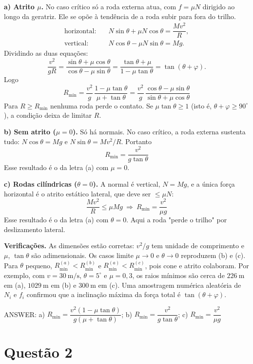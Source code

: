 \documentclass{article}%
\begin{document}
\textbf{a) Atrito $\mu$.} No caso crítico só a roda externa atua, com $f=\mu N$ dirigido ao longo da geratriz. Ele se opõe à tendência de a roda subir para fora do trilho.
\[
\begin{aligned}
\text{horizontal:}\quad & N\sin\theta+\mu N\cos\theta=\dfrac{Mv^{2}}{R},\\[2pt]
\text{vertical:}\quad & N\cos\theta-\mu N\sin\theta=Mg .
\end{aligned}
\]
Dividindo as duas equações:
\[
\frac{v^{2}}{gR}=\frac{\sin\theta+\mu\cos\theta}{\cos\theta-\mu\sin\theta}=\frac{\tan\theta+\mu}{1-\mu\tan\theta}=\tan(\theta+\varphi).
\]
Logo
\[
\boxed{R_{\min}=\frac{v^{2}}{g}\,\frac{1-\mu\tan\theta}{\mu+\tan\theta}=\frac{v^{2}}{g}\,\frac{\cos\theta-\mu\sin\theta}{\sin\theta+\mu\cos\theta}}
\]
Para $R\ge R_{\min}$ nenhuma roda perde o contato. Se $\mu\tan\theta\ge1$ (isto é, $\theta+\varphi\ge 90^\circ$), a condição deixa de limitar $R$.

\textbf{b) Sem atrito ($\mu=0$).} Só há normais. No caso crítico, a roda externa sustenta tudo: $N\cos\theta=Mg$ e $N\sin\theta=Mv^{2}/R$. Portanto
\[
\boxed{R_{\min}=\frac{v^{2}}{g\tan\theta}}
\]
Esse resultado é o da letra (a) com $\mu=0$.

\textbf{c) Rodas cilíndricas ($\theta=0$).} A normal é vertical, $N=Mg$, e a única força horizontal é o atrito estático lateral, que deve ser $\le\mu N$:
\[
\frac{Mv^{2}}{R}\le\mu Mg\ \Rightarrow\ \boxed{R_{\min}=\frac{v^{2}}{\mu g}}
\]
Esse resultado é o da letra (a) com $\theta=0$. Aqui a roda "perde o trilho" por deslizamento lateral.

\textbf{Verificações.} As dimensões estão corretas: $v^{2}/g$ tem unidade de comprimento e $\mu$, $\tan\theta$ são adimensionais. Os casos limite $\mu\to0$ e $\theta\to0$ reproduzem (b) e (c). Para $\theta$ pequeno, $R_{\min}^{(a)}<R_{\min}^{(b)}$ e $R_{\min}^{(a)}<R_{\min}^{(c)}$, pois cone e atrito colaboram. Por exemplo, com $v=30\ \mathrm{m/s}$, $\theta=5^\circ$ e $\mu=0,3$, os raios mínimos são cerca de $226\ \mathrm{m}$ em (a), $1029\ \mathrm{m}$ em (b) e $300\ \mathrm{m}$ em (c). Uma amostragem numérica aleatória de $N_i$ e $f_i$ confirmou que a inclinação máxima da força total é $\tan(\theta+\varphi)$.

ANSWER: a) $R_{\min}=\dfrac{v^{2}(1-\mu\tan\theta)}{g(\mu+\tan\theta)}$; b) $R_{\min}=\dfrac{v^{2}}{g\tan\theta}$; c) $R_{\min}=\dfrac{v^{2}}{\mu g}$%
\newpage%
\section*{Questão 2}
\end{document}
